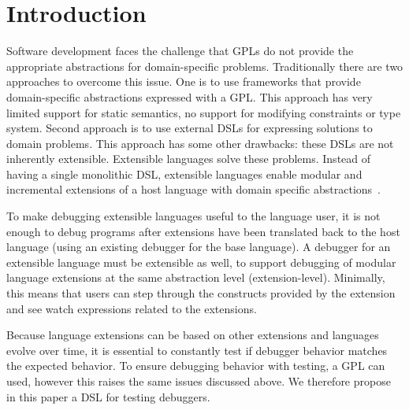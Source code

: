 \section{Introduction}

Software development faces the challenge that \acp{GPL}
do not provide the appropriate abstractions for domain-specific problems. 
Traditionally there are two  
approaches to overcome this issue. One is to use frameworks 
that provide domain-specific abstractions expressed with a \ac{GPL}.
This approach has very limited support for static semantics, \eg 
no support for modifying constraints or type system.
Second approach is to use external \acp{DSL} for 
expressing solutions to domain problems. This approach 
has some other drawbacks: 
these \acp{DSL} are not inherently extensible.
Extensible languages solve these problems. Instead of having a single 
monolithic \ac{DSL}, extensible languages enable modular and 
incremental extensions of a host language with domain specific 
abstractions~\cite{Voelter2011}.

To make debugging extensible languages useful to the language user, it is not
enough to debug programs after extensions have been translated back to the host 
language (using an existing debugger for the base language).  
A debugger for an extensible language must be extensible as well, to support
debugging of modular language extensions at the same abstraction level
(extension-level).
Minimally, this means that users can step through the constructs 
provided by the extension and see watch expressions related to the extensions.

Because language extensions can be based on other extensions and languages
evolve over time, it is essential to constantly test if debugger
behavior matches the expected behavior. To ensure debugging behavior with
testing, a \ac{GPL} can used, however this raises the same issues
discussed above. 
We therefore propose in this paper a \ac{DSL} 
for testing debuggers. 
